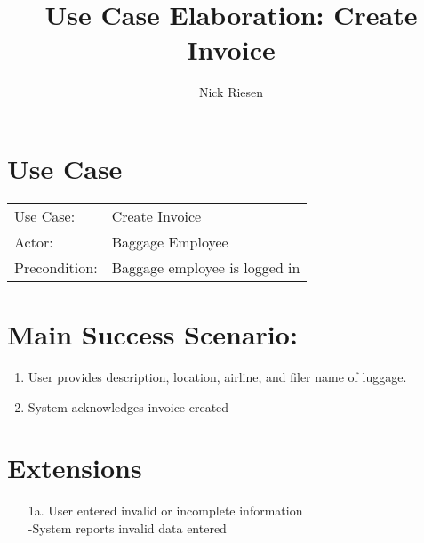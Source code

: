 \documentclass{article}
\title{Use Case Elaboration: Create Invoice}
\author{ Nick Riesen }
\begin{document}
\maketitle


\section*{Use Case}
\begin{tabular}{l l}
Use Case:     & Create Invoice                \\
Actor:        & Baggage Employee              \\
Precondition: & Baggage employee is logged in \\
\end{tabular}


\section*{Main Success Scenario:}

\begin{enumerate}
    \item  User provides description, location, airline, and filer name of luggage. 
    \item System acknowledges invoice created

\end{enumerate}

\section*{Extensions}

\begin{itemize}
    \item [1a.] User entered invalid or incomplete information \\
        -System reports invalid data entered
                            
\end{itemize}
\end{document}
